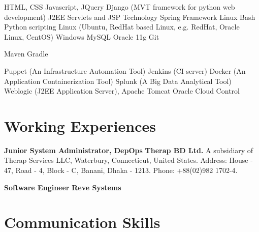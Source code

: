 \documentclass[11pt,a4paper,sans]{moderncv}
\begin{document}
{
HTML, CSS
\newline Javascript, JQuery
\newline Django (MVT framework for python web development)
\newline J2EE Servlets and JSP Technology
\newline Spring Framework
}
{
Linux Bash
\newline Python scripting
}
{
Linux (Ubuntu, RedHat based Linux, e.g. RedHat, Oracle Linux, CentOS)
\newline Windows
}
{
MySQL
\newline Oracle 11g
}
{
Git
}

{
Maven
\newline Gradle
}

{
Puppet (An Infrastructure Automation Tool)
\newline Jenkins (CI server)
\newline Docker (An Application Containerization Tool)
\newline Splunk (A Big Data Analytical Tool)
\newline Weblogic (J2EE Application Server), Apache Tomcat
\newline Oracle Cloud Control
}


\section{Working Experiences}
{
\textbf{Junior System Administrator, DepOps\newline}
\textbf{Therap BD Ltd.\newline}
A subsidiary of Therap Services LLC, Waterbury, Connecticut, United States.\newline
Address: House - 47, Road - 4, Block - C, Banani, Dhaka - 1213. \newline
Phone: +88(02)982 1702-4.
}

{
\textbf{Software Engineer\newline}
\textbf{Reve Systems\newline}
}



\section{Communication Skills}
\end{document}
